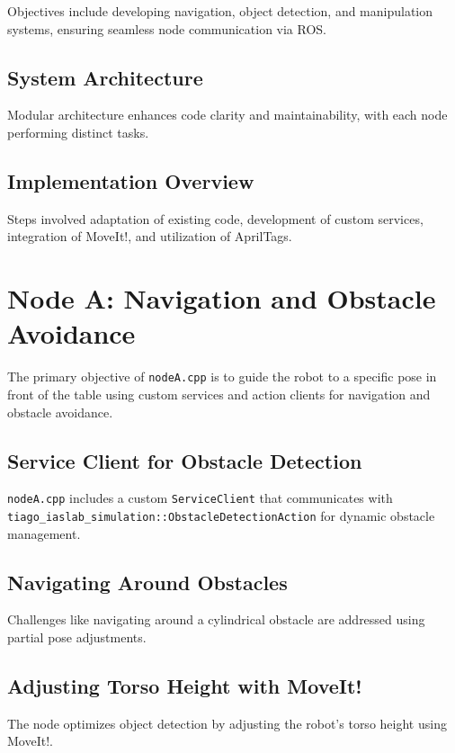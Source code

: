 \documentclass[a4paper]{article}
\begin{document}
Objectives include developing navigation, object detection, and manipulation systems, ensuring seamless node communication via ROS.

\subsection{System Architecture}

Modular architecture enhances code clarity and maintainability, with each node performing distinct tasks.

\subsection{Implementation Overview}

Steps involved adaptation of existing code, development of custom services, integration of MoveIt!, and utilization of AprilTags.

\section{Node A: Navigation and Obstacle Avoidance}

The primary objective of \texttt{nodeA.cpp} is to guide the robot to a specific pose in front of the table using custom services and action clients for navigation and obstacle avoidance.

\subsection{Service Client for Obstacle Detection}

\texttt{nodeA.cpp} includes a custom \texttt{ServiceClient} that communicates with \texttt{tiago\_iaslab\_simulation::ObstacleDetectionAction} for dynamic obstacle management.

\subsection{Navigating Around Obstacles}

Challenges like navigating around a cylindrical obstacle are addressed using partial pose adjustments.

\subsection{Adjusting Torso Height with MoveIt!}

The node optimizes object detection by adjusting the robot's torso height using MoveIt!.
\end{document}
